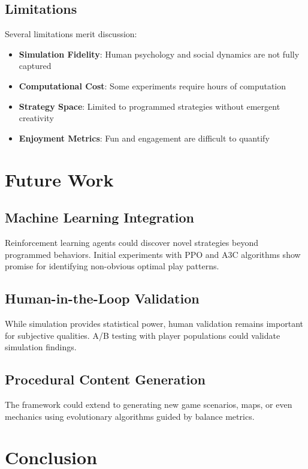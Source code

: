 \documentclass[sigconf]{acmart}
\begin{document}
\subsection{Limitations}

Several limitations merit discussion:
\begin{itemize}
\item \textbf{Simulation Fidelity}: Human psychology and social dynamics are not fully captured
\item \textbf{Computational Cost}: Some experiments require hours of computation
\item \textbf{Strategy Space}: Limited to programmed strategies without emergent creativity
\item \textbf{Enjoyment Metrics}: Fun and engagement are difficult to quantify
\end{itemize}

\section{Future Work}

\subsection{Machine Learning Integration}

Reinforcement learning agents could discover novel strategies beyond programmed behaviors. Initial experiments with PPO and A3C algorithms show promise for identifying non-obvious optimal play patterns.

\subsection{Human-in-the-Loop Validation}

While simulation provides statistical power, human validation remains important for subjective qualities. A/B testing with player populations could validate simulation findings.

\subsection{Procedural Content Generation}

The framework could extend to generating new game scenarios, maps, or even mechanics using evolutionary algorithms guided by balance metrics.

\section{Conclusion}
\end{document}
